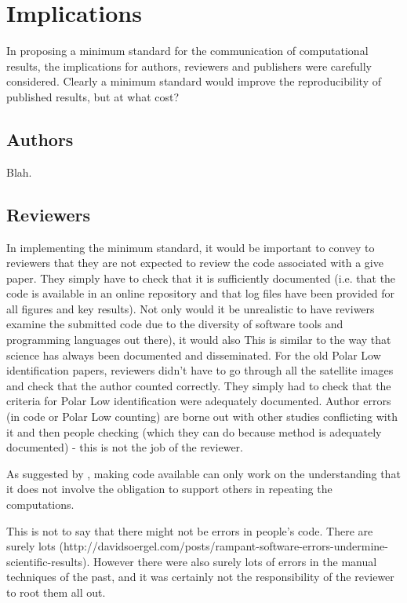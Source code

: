 \section{Implications}

In proposing a minimum standard for the communication of computational results, the implications for authors, reviewers and publishers were carefully considered. Clearly a minimum standard would improve the reproducibility of published results, but at what cost?

\subsection{Authors}

Blah.

\subsection{Reviewers}

In implementing the minimum standard, it would be important to convey to reviewers that they are not expected to review the code associated with a give paper. They simply have to check that it is sufficiently documented (i.e. that the code is available in an online repository and that log files have been provided for all figures and key results). Not only would it be unrealistic to have reviwers examine the submitted code due to the diversity of software tools and programming languages out there), it would also This is similar to the way that science has always been documented and disseminated. For the old Polar Low identification papers, reviewers didn't have to go through all the satellite images and check that the author counted correctly. They simply had to check that the criteria for Polar Low identification were adequately documented. Author errors (in code or Polar Low counting) are borne out with other studies conflicting with it and then people checking (which they can do because method is adequately documented) - this is not the job of the reviewer.

As suggested by \citet{Easterbrook2014}, making code available can only work on the understanding that it does not involve the obligation to support others in repeating the computations.

This is not to say that there might not be errors in people's code. There are surely lots (http://davidsoergel.com/posts/rampant-software-errors-undermine-scientific-results). However there were also surely lots of errors in the manual techniques of the past, and it was certainly not the responsibility of the reviewer to root them all out.